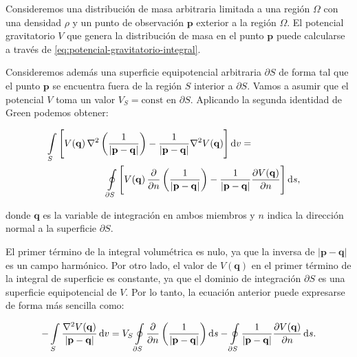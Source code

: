 Consideremos una distribución de masa arbitraria limitada a una región $\Omega$
con una densidad $\rho$ y un punto de observación $\mathbf{p}$ exterior a la
región $\Omega$.
El potencial gravitatorio $V$ que genera la distribución de masa en el punto
$\mathbf{p}$ puede calcularse a través de
\ref{eq:potencial-gravitatorio-integral}.

Consideremos además una superficie equipotencial arbitraria $\partial S$ de
forma tal que el punto $\mathbf{p}$ se encuentra fuera de la región $S$
interior a $\partial S$.
Vamos a asumir que el potencial $V$ toma un valor $V_S = \text{const}$ en
$\partial S$.
Aplicando la segunda identidad de Green \citep[][p.~23]{blakely1995} podemos
obtener:

\begin{equation}
    \begin{split}
    \int\limits_S
        \Bigg[
            V(\mathbf{q}) \,
            \nabla^2 \left( \frac{1}{|\mathbf{p} - \mathbf{q}|} \right)
            - \frac{1}{|\mathbf{p} - \mathbf{q}|}  \nabla^2 V(\mathbf{q})
        \Bigg]
    \mathop{}\!\textnormal{d} v
    = \\
    \oint\limits_{\partial S}
        \Bigg[
            V(\mathbf{q}) \,
            \frac{\partial}{\partial n}
            \left( \frac{1}{|\mathbf{p} - \mathbf{q}|} \right)
            -
            \frac{1}{|\mathbf{p} - \mathbf{q}|}
            &\frac{\partial V(\mathbf{q})}{\partial n}
        \Bigg]
    \mathop{}\!\textnormal{d} s,
    \end{split}
\end{equation}

\noindent donde $\mathbf{q}$ es la variable de integración en ambos miembros
y $n$ indica la dirección normal a la superficie $\partial S$.

El primer término de la integral volumétrica es nulo, ya que la inversa de
$|\mathbf{p} - \mathbf{q}|$ es un campo harmónico.
Por otro lado, el valor de $V(\mathbf{q})$ en el primer término de la integral
de superficie es constante, ya que el dominio de integración $\partial S$ es
una superficie equipotencial de $V$.
Por lo tanto, la ecuación anterior puede expresarse de forma más sencilla como:

\begin{equation}
    - \int\limits_S
        \frac{\nabla^2 V(\mathbf{q})}{|\mathbf{p} - \mathbf{q}|}
    \mathop{}\!\textnormal{d} v
    =
    V_S
    \oint\limits_{\partial S}
        \frac{\partial}{\partial n}
        \left( \frac{1}{|\mathbf{p} - \mathbf{q}|} \right)
    \mathop{}\!\textnormal{d} s
    - \oint\limits_{\partial S}
        \frac{1}{|\mathbf{p} - \mathbf{q}|}
        \frac{\partial V(\mathbf{q})}{\partial n}
    \mathop{}\!\textnormal{d} s.
\end{equation}

